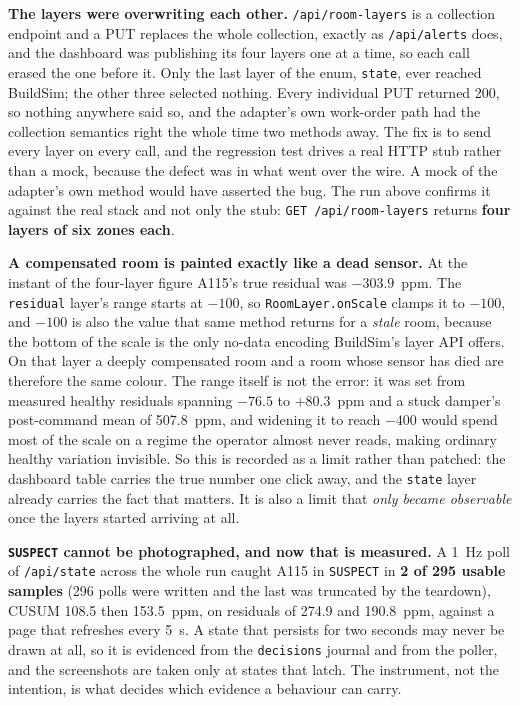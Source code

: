 \textbf{The layers were overwriting each other.} \texttt{/api/room-layers} is a collection
endpoint and a PUT replaces the whole collection, exactly as \texttt{/api/alerts} does, and the
dashboard was publishing its four layers one at a time, so each call erased the one before it.
Only the last layer of the enum, \texttt{state}, ever reached BuildSim; the other three selected
nothing. Every individual PUT returned 200, so nothing anywhere said so, and the adapter's own
work-order path had the collection semantics right the whole time two methods away. The fix is to
send every layer on every call, and the regression test drives a real HTTP stub rather than a mock,
because the defect was in what went over the wire. A mock of the adapter's own method would have
asserted the bug. The run above confirms it against the real stack and not only the stub:
\texttt{GET /api/room-layers} returns \textbf{four layers of six zones each}.

\textbf{A compensated room is painted exactly like a dead sensor.} At the instant of the four-layer
figure A115's true residual was $-303.9$~ppm. The \texttt{residual} layer's range starts at $-100$,
so \texttt{RoomLayer.onScale} clamps it to $-100$, and $-100$ is also the value that same method
returns for a \emph{stale} room, because the bottom of the scale is the only no-data encoding
BuildSim's layer API offers. On that layer a deeply compensated room and a room whose sensor has
died are therefore the same colour. The range itself is not the error: it was set from measured
healthy residuals spanning $-76.5$ to $+80.3$~ppm and a stuck damper's post-command mean of
507.8~ppm, and widening it to reach $-400$ would spend most of the scale on a regime the operator
almost never reads, making ordinary healthy variation invisible. So this is recorded as a limit
rather than patched: the dashboard table carries the true number one click away, and the
\texttt{state} layer already carries the fact that matters. It is also a limit that \emph{only
became observable} once the layers started arriving at all.

\textbf{\texttt{SUSPECT} cannot be photographed, and now that is measured.} A 1~Hz poll of
\texttt{/api/state} across the whole run caught A115 in \texttt{SUSPECT} in \textbf{2 of 295
usable samples} (296 polls were written and the last was truncated by the teardown), CUSUM 108.5 then 153.5~ppm, on residuals of 274.9 and 190.8~ppm, against a page
that refreshes every 5~s. A state that persists for two seconds may never be drawn at all, so it
is evidenced from the \texttt{decisions} journal and from the poller, and the screenshots are taken
only at states that latch. The instrument, not the intention, is what decides which evidence a
behaviour can carry.
